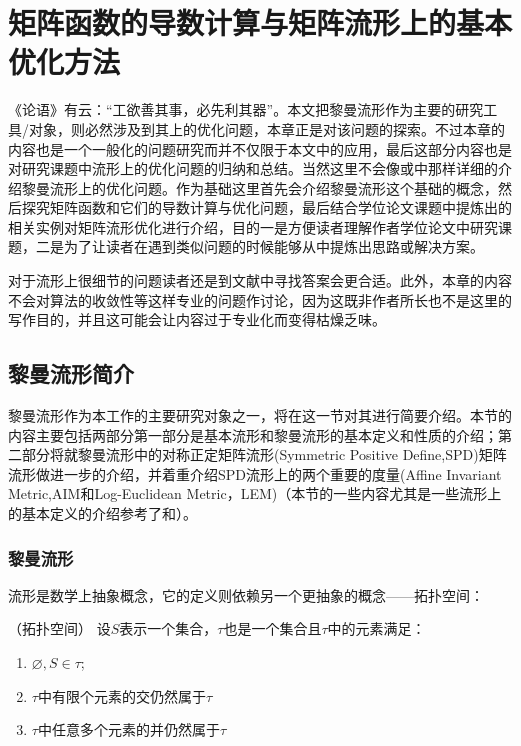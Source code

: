 \chapter{矩阵函数的导数计算与矩阵流形上的基本优化方法}
\label{chap:Matdev_basicManiopt}
《论语》有云：“工欲善其事，必先利其器”。本文把黎曼流形作为主要的研究工具/对象，则必然涉及到其上的优化问题，本章正是对该问题的探索。不过本章的内容也是一个一般化的问题研究而并不仅限于本文中的应用，最后这部分内容也是对研究课题中流形上的优化问题的归纳和总结。当然这里不会像\cite{Maniopt_DiscreteCurveFitting}或\cite{Maniopt_book}中那样详细的介绍黎曼流形上的优化问题。作为基础这里首先会介绍黎曼流形这个基础的概念，然后探究矩阵函数和它们的导数计算与优化问题，最后结合学位论文课题中提炼出的相关实例对矩阵流形优化进行介绍，目的一是方便读者理解作者学位论文中研究课题，二是为了让读者在遇到类似问题的时候能够从中提炼出思路或解决方案。

对于流形上很细节的问题读者还是到文献\cite{Maniopt_DiscreteCurveFitting,Maniopt_book}中寻找答案会更合适。此外，本章的内容不会对算法的收敛性等这样专业的问题作讨论，因为这既非作者所长也不是这里的写作目的，并且这可能会让内容过于专业化而变得枯燥乏味。
\section{黎曼流形简介}
\label{sec:manifold}
黎曼流形作为本工作的主要研究对象之一，将在这一节对其进行简要介绍。本节的内容主要包括两部分第一部分是基本流形和黎曼流形的基本定义和性质的介绍；第二部分将就黎曼流形中的对称正定矩阵流形(Symmetric Positive Define,SPD)矩阵流形做进一步的介绍，并着重介绍SPD流形上的两个重要的度量(Affine Invariant Metric,AIM和Log-Euclidean Metric，LEM)（本节的一些内容尤其是一些流形上的基本定义的介绍参考了\cite{Manifold}和\cite{PHDThesis}）。
\subsection{黎曼流形}
\label{sec:manifold_Riemaniann}
流形是数学上抽象概念，它的定义则依赖另一个更抽象的概念——拓扑空间：
\begin{definition}
\label{Topology}
{\heiti（拓扑空间）} 设$S$表示一个集合，$\tau$也是一个集合且$\tau$中的元素满足：
\begin{enumerate}
\item $\varnothing,S \in \tau$;
\item $\tau$中有限个元素的交仍然属于$\tau$
\item $\tau$中任意多个元素的并仍然属于$\tau$
\end{enumerate}
\end{definition}

